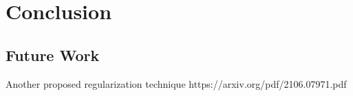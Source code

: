 %
\chapter{Conclusion}
\label{sec:conclusion}


\section{Future Work}
\label{sec:conclusion:future}


Another proposed regularization technique
https://arxiv.org/pdf/2106.07971.pdf